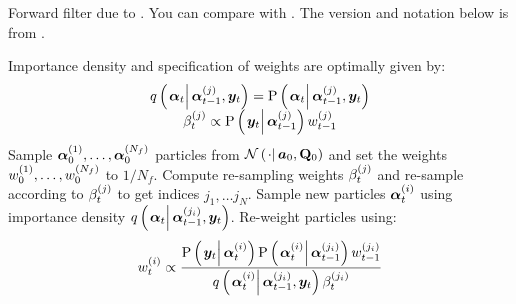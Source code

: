 \begin{algorithm}[H]
\caption{Forward filter due to \cite{pitt99}. You can compare with \citet[page 20 and 25]{doucet09}. The version and notation below is from \citet[page 449]{fearnhead10}.}\label{alg:forward}
\begin{algorithmic}[1]\raggedright
\INPUT
\Statex Importance density and specification of weights are optimally given by: 
\Statex \begin{equation}\begin{matrix}
	\IDC{\vec{\alpha}_t}{\partic{\vec{\alpha}}{t-1}{j}, \vec{y}_t} = \propC{\vec{\alpha}_t}{\partic{\vec{\alpha}}{t-1}{j}, \vec{y}_t} \\
	\partic{\beta}{t}{j} \propto \propC{\vec{y}_t}{\partic{\vec{\alpha}}{t-1}{j}}\partic{w}{t-1}{j}
\end{matrix}\end{equation}
%
\State Sample $\bm{\alpha}_{0}^{\left( 1\right)},\dots,\bm{\alpha}_{0}^{\left( N_f\right)}$ particles from $\normalC{\cdot}{\vec{a}_0}{\mat{Q}_0}$ and set the weights $w_{0}^{\left( 1\right)},\dots,w_{0}^{\left( N_f\right)}$ to $1 / N_f$.
%
\State Compute re-sampling weights $\beta_{t}^{\left( j\right)}$ and re-sample according to $\beta_{t}^{\left( j\right)}$ to get indices $j_1,\dots j_N$.
\EndProcedure
%
\State Sample new particles $\bm{\alpha}_{t}^{\left( i\right)}$ using importance density $\IDC{\vec{\alpha}_t}{\partic{\vec{\alpha}}{t-1}{j_i}, \vec{y}_t}$.
\EndProcedure
%
\State Re-weight particles using:
\StateX \begin{equation}\label{eqn:forwardWeight}
	\partic{w}{t}{i} \propto \frac{
		\propC{\vec{y}_t}{\partic{\vec{\alpha}}{t}{i}}
		\propC{\partic{\vec{\alpha}}{t}{i}}{\partic{\vec{\alpha}}{t-1}{j_i}}
		\partic{w}{t-1}{j_i}
	}{ %
		\IDC{\partic{\vec{\alpha}}{t}{i}}{\partic{\vec{\alpha}}{t-1}{j_i}, \vec{y}_t}
		\partic{\beta}{t}{j_i}
	}
\end{equation}
\EndProcedure
\EndFor
\end{algorithmic}
\end{algorithm}



